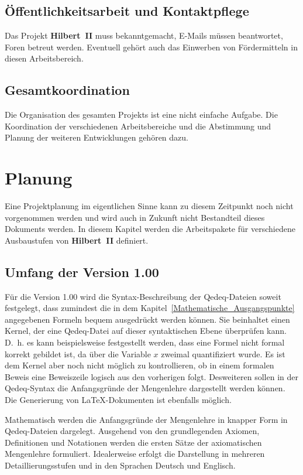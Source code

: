 \documentclass[a4paper,german,10pt,twoside]{book}
\begin{document}
{\section{{\"O}ffentlichkeitsarbeit und Kontaktpflege}
Das Projekt \textbf{Hilbert~II} muss bekanntgemacht, E-Mails m{\"u}ssen beantwortet, Foren betreut
werden. Eventuell geh{\"o}rt auch das Einwerben von F{\"o}rdermitteln in diesen Arbeitsbereich.

\section{Gesamtkoordination}
Die Organisation des gesamten Projekts ist eine nicht einfache Aufgabe. Die Koordination der
verschiedenen Arbeitsbereiche und die Abstimmung und Planung der weiteren Entwicklungen geh{\"o}ren
dazu.


\chapter{Planung} \label{Projektplanung}

Eine Projektplanung im eigentlichen Sinne kann zu diesem Zeitpunkt noch nicht vorgenommen werden
und wird auch in Zukunft nicht Bestandteil dieses Dokuments werden. In diesem Kapitel werden die
Arbeitspakete f{\"u}r verschiedene Ausbaustufen von \textbf{Hilbert~II} definiert.

\section{Umfang der Version 1.00}
F{\"u}r die Version 1.00 wird die Syntax-Beschreibung der Qedeq-Dateien soweit festgelegt, dass
zumindest die in dem Kapitel~\ref{Mathematische_Ausgangspunkte} angegebenen Formeln bequem
ausgedr{\"u}ckt werden k{\"o}nnen. Sie beinhaltet einen Kernel, der eine Qedeq-Datei auf dieser
syntaktischen Ebene {\"u}berpr{\"u}fen kann. D.~h. es kann beispielsweise festgestellt werden, dass eine
Formel nicht formal korrekt gebildet ist, da {\"u}ber die Variable $x$ zweimal quantifiziert wurde. Es
ist dem Kernel aber noch nicht m{\"o}glich zu kontrollieren, ob in einem formalen Beweis eine
Beweiszeile logisch aus den vorherigen folgt. Desweiteren sollen in der Qedeq-Syntax die
Anfangsgr{\"u}nde der Mengenlehre dargestellt werden k{\"o}nnen. Die Generierung von \LaTeX{}-Dokumenten
ist ebenfalls m{\"o}glich.
\par
Mathematisch werden die Anfangsgr{\"u}nde der Mengenlehre in knapper Form in Qedeq-Dateien dargelegt.
Ausgehend von den grundlegenden Axiomen, Definitionen und Notationen werden die ersten S{\"a}tze der
axiomatischen Mengenlehre formuliert. Idealerweise erfolgt die Darstellung in mehreren
Detaillierungsstufen und in den Sprachen Deutsch und Englisch.

}
\end{document}

